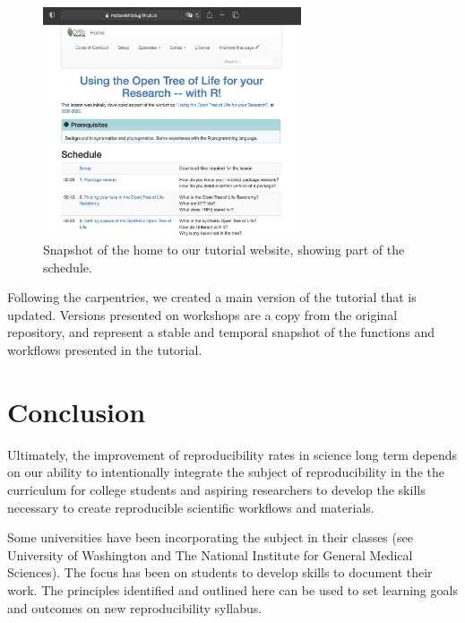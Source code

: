 \documentclass[12pt]{article}
\begin{document}
\begin{figure}
\begin{center}
\includegraphics[width=3in]{fig2.png}
\end{center}
\caption{Snapshot of the home to our tutorial website, showing part of the schedule. \label{fig:second}}
\end{figure}

Following the carpentries, we created a main version of the tutorial that
is updated. Versions presented on workshops are a copy from the original repository,
and represent a stable and temporal snapshot of the functions and workflows presented
in the tutorial.


\section*{Conclusion}
\label{sec:conclusion}

Ultimately, the improvement of reproducibility rates in science long term depends
on our ability to intentionally integrate the subject of reproducibility in the
the curriculum for college students and aspiring researchers to develop the skills
necessary to create reproducible scientific workflows and materials.

Some universities have been incorporating the subject in their classes (see University
 of Washington and The National Institute for General Medical Sciences).
The focus has been on students to develop skills to document their work.
The principles identified and outlined here can be used to set learning goals and
 outcomes on new reproducibility syllabus.
\end{document}

